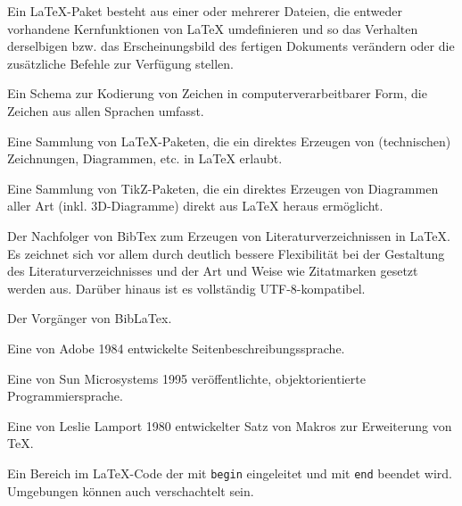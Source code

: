 



%
{%
Ein LaTeX-Paket besteht aus einer oder mehrerer Dateien, die entweder vorhandene
Kernfunktionen von LaTeX umdefinieren und so das Verhalten derselbigen bzw.
das Erscheinungsbild des fertigen Dokuments verändern oder die zusätzliche
Befehle zur Verfügung stellen.}

%
{%
Ein Schema zur Kodierung von Zeichen in computerverarbeitbarer Form, die Zeichen
aus allen Sprachen umfasst.}

%
{%
Eine Sammlung von LaTeX-Paketen, die ein direktes Erzeugen von (technischen)
Zeichnungen, Diagrammen, etc. in LaTeX erlaubt.}

%
{%
Eine Sammlung von TikZ-Paketen, die ein direktes Erzeugen von Diagrammen aller
Art (inkl. 3D-Diagramme) direkt aus LaTeX heraus ermöglicht.}

%
{%
Der Nachfolger von BibTex zum Erzeugen von Literaturverzeichnissen in LaTeX. Es
zeichnet sich vor allem durch deutlich bessere Flexibilität bei der Gestaltung
des Literaturverzeichnisses und der Art und Weise wie Zitatmarken gesetzt werden
aus. Darüber hinaus ist es vollständig UTF-8-kompatibel.
}

%
{%
Der Vorgänger von BibLaTex.}

%
{%
Eine von Adobe 1984 entwickelte Seitenbeschreibungssprache.}

%
{%
Eine von Sun Microsystems 1995 veröffentlichte, objektorientierte Programmiersprache.}

%
{%
Eine von Leslie Lamport 1980 entwickelter Satz von Makros zur Erweiterung von TeX.}


%
{%
Ein Bereich im LaTeX-Code der mit \texttt{begin} eingeleitet und mit \texttt{end}
beendet wird. Umgebungen können auch verschachtelt sein.}